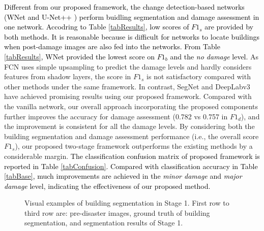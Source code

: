 \documentclass[journal]{IEEEtran}
\begin{document}
\textcolor{black}{Different from our proposed framework, the change detection-based networks (WNet \cite{houWNetCDGANBitemporal2020} and U-Net++ \cite{pengEndtoEndChangeDetection2019}) perform buidling segmentation and damage assessment in one network. Accodring to Table \ref{tabResults}, low scores of $F1_s$ are provided by both methods. It is reasonable because is difficult for networks to locate buildings when post-damage images are also fed into the networks. From Table \ref{tabResults}, WNet provided the lowest score on $F1_b$ and the \textit{no damage} level.}
As FCN uses simple upsampling to predict the damage levels and hardly considers features from shadow layers, the score in $F1_s$ is not satisfactory compared with other methods under the same framework. In contrast, SegNet and DeepLabv3 have achieved promising results using our proposed framework. Compared with the vanilla network, our overall approach incorporating the proposed components further improves the accuracy for damage assessment (0.782 vs 0.757 in $F1_d$), and the improvement is consistent for all the damage levels. By considering both the building segmentation and damage assessment performance (i.e., the overall score $F1_s$), our proposed two-stage framework outperforms the existing methods \cite{gupta2020rescuenet,weber2020building} by a considerable margin. 
\textcolor{black}{The classification confusion matrix of proposed framework is reported in Table \ref{tabConfusion}. Compared with classification accuracy in Table \ref{tabBase}, much improvements are achieved in the \textit{minor damage} and \textit{major damage} level, indicating the effectiveness of our proposed method. }


\begin{figure}[t]
	\centering
	 \hspace{-3mm}
	\caption{Visual examples of building segmentation in Stage 1. First row to third row are: pre-disaster images, ground truth of building segmentation, and segmentation results of Stage 1. }
	\label{figBuildingloc}
\end{figure}
\end{document}
